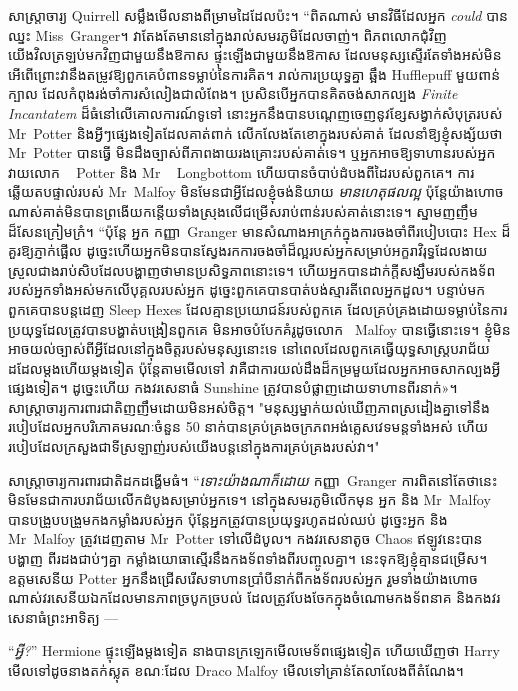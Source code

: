 សាស្រ្តាចារ្យ Quirrell សម្លឹងមើលនាងពីម្រាមដៃដែលប៉ះ។ “ពិតណាស់ មានវិធីដែលអ្នក \emph{could} បានឈ្នះ Miss~Granger។ វាតែងតែមាននៅក្នុងរាល់សមរភូមិដែលចាញ់។ ពិភពលោកជុំវិញយើងវិលត្រឡប់មកវិញជាមួយនឹងឱកាស ផ្ទុះឡើងជាមួយនឹងឱកាស ដែលមនុស្សស្ទើរតែទាំងអស់មិនអើពើព្រោះវានឹងតម្រូវឱ្យពួកគេបំពានទម្លាប់នៃការគិត។ រាល់ការប្រយុទ្ធគ្នា ឆ្អឹង Hufflepuff មួយពាន់ក្បាល ដែលកំពុងរង់ចាំការសំលៀងជាលំពែង។ ប្រសិនបើអ្នកបានគិតចង់សាកល្បង \emph{Finite Incantatem} ដ៏ធំនៅលើគោលការណ៍ទូទៅ នោះអ្នកនឹងបានបណ្តេញចេញនូវខ្សែសង្វាក់សំបុត្ររបស់ Mr~Potter និងអ្វីៗផ្សេងទៀតដែលគាត់ពាក់ លើកលែងតែខោក្នុងរបស់គាត់ ដែលនាំឱ្យខ្ញុំសង្ស័យថា Mr~Potter បានធ្វើ មិនដឹងច្បាស់ពីភាពងាយរងគ្រោះរបស់គាត់ទេ។ ឬអ្នកអាចឱ្យទាហានរបស់អ្នកវាយលោក ~ Potter និង Mr ~ Longbottom ហើយបានចំបាប់ដំបងពីដៃរបស់ពួកគេ។ ការឆ្លើយតបផ្ទាល់របស់ Mr~Malfoy មិនមែនជាអ្វីដែលខ្ញុំចង់និយាយ \emph{មានហេតុផលល្អ} ប៉ុន្តែយ៉ាងហោចណាស់គាត់មិនបានព្រងើយកន្តើយទាំងស្រុងលើជម្រើសរាប់ពាន់របស់គាត់នោះទេ។ ស្នាមញញឹមដ៏សែនក្រៀមក្រំ។ “ប៉ុន្តែ អ្នក កញ្ញា~Granger មានសំណាងអាក្រក់ក្នុងការចងចាំពីរបៀបបោះ Hex ដ៏គួរឱ្យភ្ញាក់ផ្អើល ដូច្នេះហើយអ្នកមិនបានស្វែងរកការចងចាំដ៏ល្អរបស់អ្នកសម្រាប់អក្ខរាវិរុទ្ធដែលងាយស្រួលជាងរាប់សិបដែលបង្ហាញថាមានប្រសិទ្ធភាពនោះទេ។ ហើយ​អ្នក​បាន​ដាក់​ក្តី​សង្ឃឹម​របស់​កងទ័ព​របស់​អ្នក​ទាំង​អស់​មក​លើ​បុគ្គល​របស់​អ្នក ដូច្នេះ​ពួកគេ​បាន​បាត់បង់​ស្មារតី​ពេល​អ្នក​ដួល។ បន្ទាប់មកពួកគេបានបន្តដេញ Sleep Hexes ដែលគ្មានប្រយោជន៍របស់ពួកគេ ដែលគ្រប់គ្រងដោយទម្លាប់នៃការប្រយុទ្ធដែលត្រូវបានបង្ហាត់បង្រៀនពួកគេ មិនអាចបំបែកគំរូដូចលោក~ Malfoy បានធ្វើនោះទេ។ ខ្ញុំមិនអាចយល់ច្បាស់ពីអ្វីដែលនៅក្នុងចិត្តរបស់មនុស្សនោះទេ នៅពេលដែលពួកគេធ្វើយុទ្ធសាស្រ្តបរាជ័យដដែលម្តងហើយម្តងទៀត ប៉ុន្តែតាមមើលទៅ វាគឺជាការយល់ដឹងដ៏កម្រមួយដែលអ្នកអាចសាកល្បងអ្វីផ្សេងទៀត។ ដូច្នេះហើយ កងវរសេនាធំ Sunshine ត្រូវបានបំផ្លាញដោយទាហានពីរនាក់»។ សាស្ត្រាចារ្យ​ការពារ​ជាតិ​ញញឹម​ដោយ​មិន​អស់​ចិត្ត។ "មនុស្សម្នាក់យល់ឃើញភាពស្រដៀងគ្នាទៅនឹងរបៀបដែលអ្នកបរិភោគមរណៈចំនួន 50 នាក់បានគ្រប់គ្រងចក្រភពអង់គ្លេសវេទមន្តទាំងអស់ ហើយរបៀបដែលក្រសួងជាទីស្រឡាញ់របស់យើងបន្តនៅក្នុងការគ្រប់គ្រងរបស់វា។"

សាស្ត្រាចារ្យការពារជាតិដកដង្ហើមធំ។ “\emph{ទោះយ៉ាងណាក៏ដោយ} កញ្ញា~Granger ការពិតនៅតែថានេះមិនមែនជាការបរាជ័យលើកដំបូងសម្រាប់អ្នកទេ។ នៅក្នុងសមរភូមិលើកមុន អ្នក និង Mr~Malfoy បានបង្រួបបង្រួមកងកម្លាំងរបស់អ្នក ប៉ុន្តែអ្នកត្រូវបានប្រយុទ្ធរហូតដល់ឈប់ ដូច្នេះអ្នក និង Mr~Malfoy ត្រូវដេញតាម Mr~Potter ទៅលើដំបូល។ កងវរសេនាតូច Chaos ឥឡូវនេះបានបង្ហាញ ពីរដងជាប់ៗគ្នា កម្លាំងយោធាស្មើរនឹងកងទ័ពទាំងពីរបញ្ចូលគ្នា។ នេះទុកឱ្យខ្ញុំគ្មានជម្រើស។ ឧត្តមសេនីយ Potter អ្នកនឹងជ្រើសរើសទាហានប្រាំបីនាក់ពីកងទ័ពរបស់អ្នក រួមទាំងយ៉ាងហោចណាស់វរសេនីយឯកដែលមានភាពច្របូកច្របល់ ដែលត្រូវបែងចែកក្នុងចំណោមកងទ័ពនាគ និងកងវរសេនាធំព្រះអាទិត្យ —

“\emph{អ្វី?}” Hermione ផ្ទុះឡើងម្តងទៀត នាងបានក្រឡេកមើលមេទ័ពផ្សេងទៀត ហើយឃើញថា Harry មើលទៅដូចនាងតក់ស្លុត ខណៈដែល Draco Malfoy មើលទៅគ្រាន់តែលាលែងពីតំណែង។

